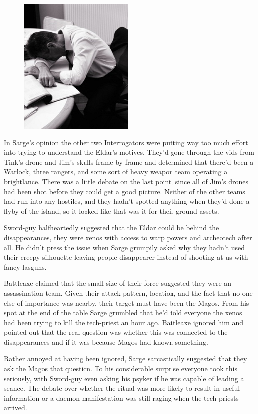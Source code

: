 \begin{figure}
	\begin{center}
		\includegraphics[width=\figwidth]{pics/11/33.png}
	\end{center}
\end{figure}
In Sarge's opinion the other two Interrogators were putting way too much effort into trying to understand the Eldar's motives. 
They'd gone through the vids from Tink's drone and Jim's skulls frame by frame and determined that there'd been a Warlock, three rangers, and some sort of heavy weapon team operating a brightlance. 
There was a little debate on the last point, since all of Jim's drones had been shot before they could get a good picture. 
Neither of the other teams had run into any hostiles, and they hadn't spotted anything when they'd done a flyby of the island, so it looked like that was it for their ground assets.

Sword-guy halfheartedly suggested that the Eldar could be behind the disappearances, they were xenos with access to warp powers and archeotech after all. 
He didn't press the issue when Sarge grumpily asked why they hadn't used their creepy-silhouette-leaving people-disappearer instead of shooting at us with fancy lasguns.

Battleaxe claimed that the small size of their force suggested they were an assassination team. 
Given their attack pattern, location, and the fact that no one else of importance was nearby, their target must have been the Magos. 
From his spot at the end of the table Sarge grumbled that he'd told everyone the xenos had been trying to kill the tech-priest an hour ago. 
Battleaxe ignored him and pointed out that the real question was whether this was connected to the disappearances and if it was because Magos had known something. 


Rather annoyed at having been ignored, Sarge sarcastically suggested that they ask the Magos that question. 
To his considerable surprise everyone took this seriously, with Sword-guy even asking his psyker if he was capable of leading a seance. 
The debate over whether the ritual was more likely to result in useful information or a daemon manifestation was still raging when the tech-priests arrived.

